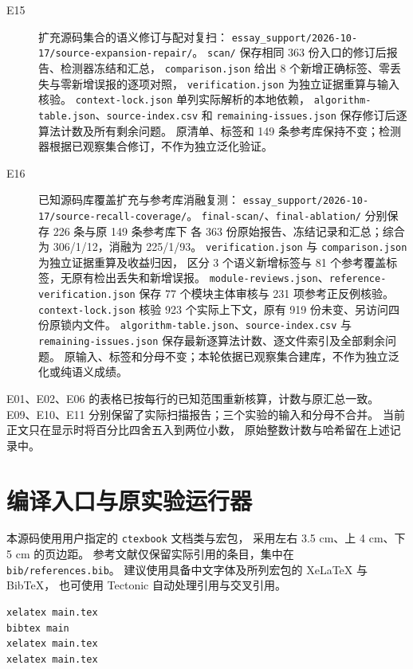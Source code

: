 \begin{description}
  \item[E15] 扩充源码集合的语义修订与配对复扫：
  \nolinkurl{essay_support/2026-10-17/source-expansion-repair/}。
  \nolinkurl{scan/} 保存相同 363 份入口的修订后报告、检测器冻结和汇总，
  \nolinkurl{comparison.json} 给出 8 个新增正确标签、零丢失与零新增误报的逐项对照，
  \nolinkurl{verification.json} 为独立证据重算与输入核验。
  \nolinkurl{context-lock.json} 单列实际解析的本地依赖，
  \nolinkurl{algorithm-table.json}、\nolinkurl{source-index.csv} 和
  \nolinkurl{remaining-issues.json} 保存修订后逐算法计数及所有剩余问题。
  原清单、标签和 149 条参考库保持不变；检测器根据已观察集合修订，不作为独立泛化验证。

  \item[E16] 已知源码库覆盖扩充与参考库消融复测：
  \nolinkurl{essay_support/2026-10-17/source-recall-coverage/}。
  \nolinkurl{final-scan/}、\nolinkurl{final-ablation/} 分别保存 226 条与原 149 条参考库下
  各 363 份原始报告、冻结记录和汇总；综合为 306/1/12，消融为 225/1/93。
  \nolinkurl{verification.json} 与 \nolinkurl{comparison.json} 为独立证据重算及收益归因，
  区分 3 个语义新增标签与 81 个参考覆盖标签，无原有检出丢失和新增误报。
  \nolinkurl{module-reviews.json}、\nolinkurl{reference-verification.json}
  保存 77 个模块主体审核与 231 项参考正反例核验。
  \nolinkurl{context-lock.json} 核验 923 个实际上下文，原有 919 份未变、另访问四份原锁内文件。
  \nolinkurl{algorithm-table.json}、\nolinkurl{source-index.csv} 与
  \nolinkurl{remaining-issues.json} 保存最新逐算法计数、逐文件索引及全部剩余问题。
  原输入、标签和分母不变；本轮依据已观察集合建库，不作为独立泛化或纯语义成绩。

\end{description}

E01、E02、E06 的表格已按每行的已知范围重新核算，计数与原汇总一致。
E09、E10、E11 分别保留了实际扫描报告；三个实验的输入和分母不合并。
当前正文只在显示时将百分比四舍五入到两位小数，
原始整数计数与哈希留在上述记录中。

\section{编译入口与原实验运行器}
本源码使用用户指定的 \nolinkurl{ctexbook} 文档类与宏包，
采用左右 3.5 cm、上 4 cm、下 5 cm 的页边距。
参考文献仅保留实际引用的条目，集中在 \nolinkurl{bib/references.bib}。
建议使用具备中文字体及所列宏包的 XeLaTeX 与 BibTeX，
也可使用 Tectonic 自动处理引用与交叉引用。

\begin{lstlisting}[basicstyle=\ttfamily\footnotesize,breaklines=true,caption={在论文源码目录编译}]
xelatex main.tex
bibtex main
xelatex main.tex
xelatex main.tex
\end{lstlisting}

